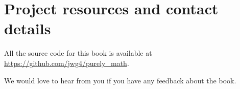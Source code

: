 \chapter{Project resources and contact details}

\bigskip\noindent
All the source code for this book is available at \url{https://github.com/jwg4/purely_math}.

\bigskip\noindent

\bigskip\noindent
We would love to hear from you if you have any feedback about the book.

